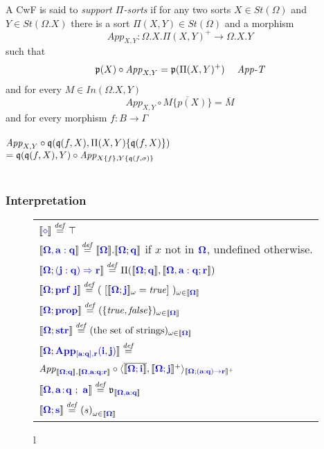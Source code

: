 \documentclass[sigplan,10pt,review,anonymous]{acmart}
\newcommand{\blum}[1]{\mathbf{\color{blue}{#1}}}
\newcommand{\defeq}{\overset{\mathit{def}}{=}}
\newcommand{\sem}[1]{\llbracket #1 \rrbracket}
\newcommand{\fm}[2]{
\left(
\tiny
#1
\normalsize
\right)_{#2}
}
\begin{document}

A CwF is said to \emph{support $\Pi$-sorts} if for any two sorts $X \in \mathit{St}(\Omega)$ and $Y \in \mathit{St}(\Omega.X)$ there is a sort $\Pi(X,Y) \in \mathit{St}(\Omega)$ and a morphism $$\mathit{App}_{X,Y} : \Omega . X . \Pi(X,Y)^+ \to \Omega . X . Y$$ such that $$\frak p(X) \circ \mathit{App}_{X,Y} = \frak p(\Pi(X,Y)^+) \hspace{3.0ex} \textit{App-T}$$
and for every $M \in \mathit{In}(\Omega.X, Y)$
$$\mathit{App}_{X,Y} \circ \overline{M \{ p(X) \}} = \overline{M}$$
and for every morphism $f : B \to \Gamma$\\~\\
$\mathit{App}_{X,Y} \circ \frak q( \frak q(f, X), \Pi(X,Y)\{ \frak q (f, X) \})$\\ 
$= \frak q(\frak q (f, X), Y) \circ \mathit{App}_{X \{ f \}, Y \{ \frak q(f, \sigma) \}}$\\~\\



\subsubsection{Interpretation}

\begin{figure}
\begin{small}
\begin{tabular}{l}
$\sem{\blum{\diamond}} \defeq \top$ \\
$\sem{\blum{\Omega,a:q}} \defeq \sem{\blum{\Omega}}.\sem{\blum{\Omega};\blum{q}}$ if $x$ not in $\blum{\Omega}$, undefined otherwise.\\
$\sem{\blum{\Omega}; \blum{(j : q) \Rightarrow r}} \defeq \Pi(\sem{\blum{\Omega};\blum{q}},\sem{\blum{\Omega,a:q};\blum{r}})$ \\
$\sem{\blum{\Omega}; \blum{\mathbf{prf}~j}} \defeq (~[ \sem{\blum{\Omega}; \blum{j}}_\omega = \mathit{true} ]~)_{\omega \in \sem{\blum{\Omega}}}$ \\
$\sem{\blum{\Omega}; \blum{prop}} \defeq ( \{ \mathit{true}, \mathit{false} \} )_{\omega \in \sem{\blum{\Omega}}}$\\
$\sem{\blum{\Omega}; \blum{str}} \defeq (\text{the set of strings})_{\omega \in \sem{\blum{\Omega}}}$\\
$\sem{\blum{\Omega}; \blum{App_{[a:q],r}(i,j)}} \defeq$ \\
\hspace{1.5ex} $\mathit{App}_{\sem{\blum{\Omega;q}},\sem{\blum{\Omega,a:q;r}}} \circ \langle \overline{\sem{\blum{\Omega ; i}}}, \sem{\blum{\Omega ; j}}^+ \rangle_{\sem{\blum{\Omega ; \blum{(a : q) \to r}}}^+}$ \\
$\sem{\blum{\Omega,a \! : \! q}~;~\blum{a}} \defeq \frak{v}_{\sem{\blum{\Omega,a:q}}}$ \\
$\sem{\blum{\Omega};\blum{s}} \defeq \fm{s}{\omega \in \sem{\blum{\Omega}}}$
\end{tabular}{l}
\end{small}
\end{figure}
\end{document}
